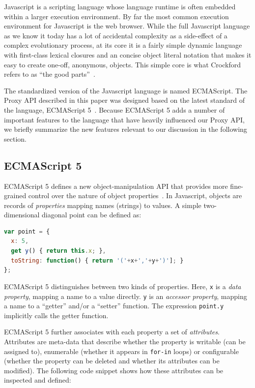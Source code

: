 \documentclass{sig-alternate}
\begin{document}
Javascript is a scripting language whose language runtime is often embedded within a larger execution environment. By far the most common execution environment for Javascript is the web browser. While the full Javascript language as we know it today has a lot of accidental complexity as a side-effect of a complex evolutionary process, at its core it is a fairly simple dynamic language with first-class lexical closures and an concise object literal notation that makes it easy to create one-off, anonymous, objects. This simple core is what Crockford refers to as ``the good parts''~\cite{crockford08good}.

The standardized version of the Javascript language is named ECMAScript. The Proxy API described in this paper was designed based on the latest standard of the language, ECMAScript 5~\cite{ECMA262}. Because ECMAScript 5 adds a number of important features to the language that have heavily influenced our Proxy API, we briefly summarize the new features relevant to our discussion in the following section.

\subsection{ECMAScript 5}
\label{sub:es5}

ECMAScript 5 defines a new object-manipulation API that provides more fine-grained control over the nature of object properties~\cite{ECMA262}. In Javascript, objects are records of \emph{properties} mapping names (strings) to values. A simple two-dimensional diagonal point can be defined as:

\begin{lstlisting}[language=javascript]
var point = {
  x: 5,
  get y() { return this.x; },
  toString: function() { return '('+x+','+y+')']; }
};
\end{lstlisting}

ECMAScript 5 distinguishes between two kinds of properties. Here, \texttt{x} is a \emph{data property}, mapping a name to a value directly. \texttt{y} is an \emph{accessor property}, mapping a name to a ``getter'' and/or a ``setter'' function. The expression \texttt{point.y} implicitly calls the getter function.

ECMAScript 5 further associates with each property a set of \emph{attributes}. Attributes are meta-data that describe whether the property is writable (can be assigned to), enumerable (whether it appears in \texttt{for-in} loops) or configurable (whether the property can be deleted and whether its attributes can be modified). The following code snippet shows how these attributes can be inspected and defined:
\end{document}
